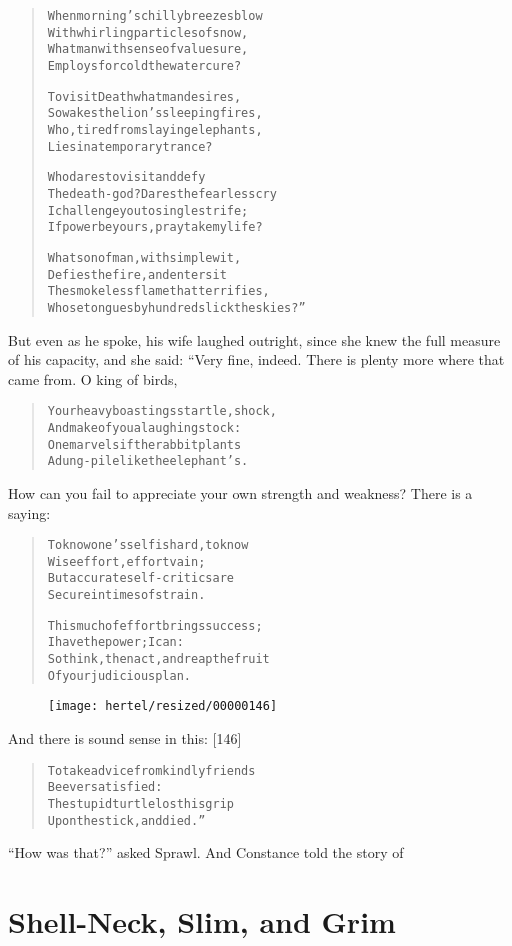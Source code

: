 \documentclass[article, twoside, 10pt]{memoir}
\renewenvironment{verbatim}{%
\begin{quote}%
\vskip -10pt%
\begin{alltt}\normalfont\small}{\end{alltt}%
\end{quote}%
\vskip -10pt
} %
\begin{document}
\begin{verbatim}
When morning's chilly breezes blow
With whirling particles of snow,
What man with sense of value sure,
Employs for cold the water cure?

To visit Death what man desires,
So wakes the lion's sleeping fires,
Who, tired from slaying elephants,
Lies in a temporary trance?

Who dares to visit and defy
The death-god? Dares the fearless cry{\textemdash}
I challenge you to single strife;
If power be yours, pray take my life?

What son of man, with simple wit,
Defies the fire, and enters it{\textemdash}
The smokeless flame that terrifies,
Whose tongues by hundreds lick the skies?”
\end{verbatim}
But even as he spoke, his wife laughed outright, since she knew the
full measure of his capacity, and she said: “Very fine, indeed.
There is plenty more where that came from. O king of birds,

\begin{verbatim}
Your heavy boastings startle, shock,
And make of you a laughingstock:
One marvels if the rabbit plants
A dung-pile like the elephant's.
\end{verbatim}
How can you fail to appreciate your own strength and weakness?
There is a saying:

\begin{verbatim}
To know one's self is hard, to know
Wise effort, effort vain;
But accurate self-critics are
Secure in times of strain.

This much of effort brings success;
I have the power; I can:
So think, then act, and reap the fruit
Of your judicious plan.
\end{verbatim}
\begin{figure}[p]\texttt{[image: hertel/resized/00000146]}\end{figure}And there is sound sense in this: [146]

\begin{verbatim}
To take advice from kindly friends
Be ever satisfied:
The stupid turtle lost his grip
Upon the stick, and died.”
\end{verbatim}
``How was that?'' asked Sprawl. And Constance told the story of

\chapter{Shell-Neck, Slim, and Grim}
\end{document}
